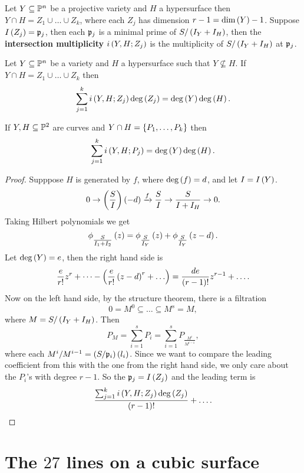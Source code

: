 \pagebreak


Let $ Y \subseteq \P^n $ be a projective variety and $ H $ a hypersurface then $ Y \cap H = Z_1 \cup \dots \cup Z_k $, where each $ Z_j $ has dimension $ r - 1 = \dim\rb{Y} - 1 $. Suppose $ I\rb{Z_j} = \pp_j $, then each $ \pp_j $ is a minimal prime of $ S / \rb{I_Y + I_H} $, then the \textbf{intersection multiplicity} $ i\rb{Y, H; Z_j} $ is the multiplicity of $ S / \rb{I_Y + I_H} $ at $ \pp_j $.

\begin{theorem}
Let $ Y \subseteq \P^n $ be a variety and $ H $ a hypersurface such that $ Y \nsubseteq H $. If $ Y \cap H = Z_1 \cup \dots \cup Z_k $ then
$$ \sum_{j = 1}^k i\rb{Y, H; Z_j}\deg\rb{Z_j} = \deg\rb{Y}\deg\rb{H}. $$
\end{theorem}

\begin{corollary}
If $ Y, H \subseteq \P^2 $ are curves and $ Y \cap H = \cb{P_1, \dots, P_k} $ then
$$ \sum_{j = 1}^k i\rb{Y, H; P_j} = \deg\rb{Y}\deg\rb{H}. $$
\end{corollary}

\begin{proof}
Supppose $ H $ is generated by $ f $, where $ \deg\rb{f} = d $, and let $ I = I\rb{Y} $.
$$ 0 \to \rb{\dfrac{S}{I}}\rb{-d} \xrightarrow{f} \dfrac{S}{I} \to \dfrac{S}{I + I_H} \to 0. $$
Taking Hilbert polynomials we get
$$ \phi_{\tfrac{S}{I_1 + I_2}}\rb{z} = \phi_{\tfrac{S}{I_Y}}\rb{z} + \phi_{\tfrac{S}{I_Y}}\rb{z - d}. $$
Let $ \deg\rb{Y} = e $, then the right hand side is
$$ \dfrac{e}{r!}z^r + \dots - \rb{\dfrac{e}{r!}\rb{z - d}^r + \dots} = \dfrac{de}{\rb{r - 1}!}z^{r - 1} + \dots. $$
Now on the left hand side, by the structure theorem, there is a filtration
$$ 0 = M^0 \subseteq \dots \subseteq M^s = M, $$
where $ M = S / \rb{I_Y + I_H} $. Then
$$ P_M = \sum_{i = 1}^s P_i = \sum_{i = 1}^s P_{\tfrac{M^i}{M^{i - 1}}}, $$
where each $ M^i / M^{i - 1} = \rb{S / \pp_i}\rb{l_i} $. Since we want to compare the leading coefficient from this with the one from the right hand side, we only care about the $ P_i $'s with degree $ r - 1 $. So the $ \pp_j = I\rb{Z_j} $ and the leading term is
$$ \dfrac{\sum_{j = 1}^k i\rb{Y, H; Z_j}\deg\rb{Z_j}}{\rb{r - 1}!} + \dots. $$
\end{proof}

\pagebreak

\section{The $ 27 $ lines on a cubic surface}

